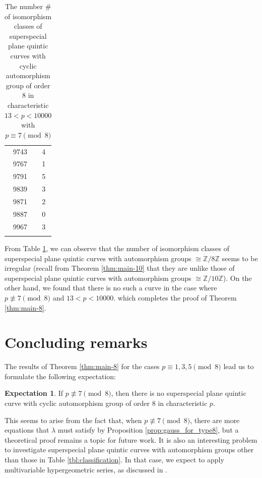 \documentclass{article}
\theoremstyle{definition}
\newtheorem{Ex}[Def]{Expectation}
\begin{document}
\begin{table}[htbp]
\begin{minipage}{0.135\textwidth}
\begin{tabular}{c|c}
        9743 & 4 \\
        9767 & 1 \\
        9791 & 5 \\
        9839 & 3 \\
        9871 & 2 \\
        9887 & 0 \\
        9967 & 3 \\
             & 
    \end{tabular}
\end{minipage}
\caption{The number $\#$ of isomorphism classes of superspecial plane quintic curves with cyclic automorphism group of order $8$ in characteristic $13 < p < 10000$ with $p \equiv 7 \pmod{8}$}\label{tbl:main}
\end{table}

\newpage 
From Table \ref{tbl:main}, we can observe that the number of isomorphism classes of superspecial plane quintic curves with automorphism groups $\cong \mathbb{Z}/8\mathbb{Z}$ seems to be irregular (recall from Theorem \ref{thm:main-10} that they are unlike those of superspecial plane quintic curves with automorphism groups $\cong \mathbb{Z}/10\mathbb{Z}$).
On the other hand, we found that there is no such a curve in the case where $p \not\equiv 7 \pmod{8}$ and $13 < p < 10000$. which completes the proof of Theorem \ref{thm:main-8}.\vspace{-1mm}

\section{Concluding remarks}\label{sec:concluding}
The results of Theorem \ref{thm:main-8} for the cases $p \equiv 1,3,5 \pmod{8}$ lead us to formulate the following expectation:\vspace{-1mm}
\begin{Ex}
If $p \not\equiv 7 \pmod{8}$, then there is no superspecial plane quintic curve with cyclic automorphism group of order $8$ in characteristic $p$.\vspace{-0.3mm}
\end{Ex}
\noindent This seems to arise from the fact that, when $p \not\equiv 7 \pmod{8}$, there are more equations that $\lambda$ must satisfy by Proposition \ref{prop:gauss_for_type8}, but a theoretical proof remains a topic for future work.
It is also an interesting problem to investigate  superspecial plane quintic curves with automorphism groups other than those in Table \ref{tbl:classification}.
In that case, we expect to apply multivariable hypergeometric series, as discussed in \cite{OH}.
\end{document}
